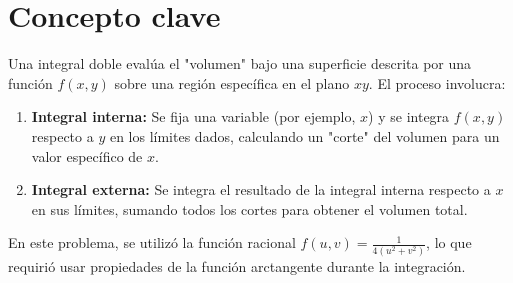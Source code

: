 \section*{Concepto clave}

Una integral doble evalúa el "volumen" bajo una superficie descrita por una función \( f(x, y) \) sobre una región específica en el plano \( xy \). El proceso involucra:

\begin{enumerate}
    \item \textbf{Integral interna:} Se fija una variable (por ejemplo, \( x \)) y se integra \( f(x, y) \) respecto a \( y \) en los límites dados, calculando un "corte" del volumen para un valor específico de \( x \).
    \item \textbf{Integral externa:} Se integra el resultado de la integral interna respecto a \( x \) en sus límites, sumando todos los cortes para obtener el volumen total.
\end{enumerate}

En este problema, se utilizó la función racional \( f(u, v) = \frac{1}{4(u^2 + v^2)} \), lo que requirió usar propiedades de la función arctangente durante la integración.
